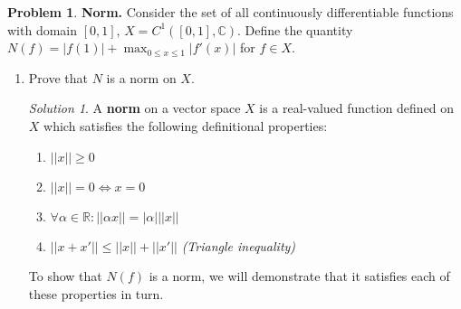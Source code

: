 \documentclass[12pt,a4paper]{article}
\theoremstyle{definition}
\newtheorem{problem}{Problem}
\theoremstyle{remark}
\newtheorem*{solution}{Solution}
\begin{document}
\begin{problem}
    \textbf{Norm.} Consider the set of all continuously differentiable functions with domain $[0, 1]$, $X=C^1([0,1], \mathbb C)$. Define the quantity $N(f)=|f(1)|+\max_{0 \le x \le 1}|f'(x)|$ for $f \in X$. 
    \begin{enumerate}
        \item Prove that $N$ is a norm on $X$. 
        \begin{solution}
            A \textbf{norm} on a vector space $X$ is a real-valued function defined on $X$ which satisfies the following definitional properties: 

            \begin{enumerate}
                \item $||x|| \ge 0$
                \item $||x||=0 \Leftrightarrow x=0$
                \item $\forall \alpha \in \mathbb R : ||\alpha x|| = |\alpha| ||x||$
                \item $||x+x'|| \le ||x|| + ||x'||$ \textit{(Triangle inequality)}
            \end{enumerate}

            To show that $N(f)$ is a norm, we will demonstrate that it satisfies each of these properties in turn. 


\end{solution}
\end{enumerate}
\end{problem}
\end{document}
